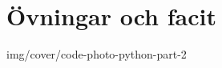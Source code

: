 \documentclass[14pt]{extbook}
\begin{document}
\thispagestyle{plain} %
\part{Övningar och facit}{img/cover/code-photo-python-part-2}

\pagestyle{fancy} %



\printindex
\end{document}
